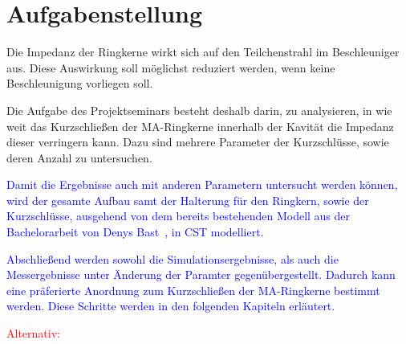 \section{Aufgabenstellung}
Die Impedanz der Ringkerne wirkt sich auf den Teilchenstrahl im Beschleuniger aus. Diese Auswirkung soll möglichst reduziert werden, wenn keine Beschleunigung vorliegen soll.
\par
Die Aufgabe des Projektseminars besteht deshalb darin, zu analysieren, in wie weit das Kurzschlie\ss{}en der MA-Ringkerne innerhalb der Kavit\"at die Impedanz dieser verringern kann. Dazu sind mehrere Parameter der Kurzschl\"usse, sowie deren Anzahl zu untersuchen.
\par
\textcolor{blue}{
Damit die Ergebnisse auch mit anderen Parametern untersucht werden k\"onnen, wird der gesamte Aufbau samt der Halterung f\"ur den Ringkern, sowie der Kurzschl\"usse, ausgehend von dem bereits bestehenden Modell aus der Bachelorarbeit von Denys Bast~\citep{bast2017ba}, in CST modelliert.}
\par
\textcolor{blue}{
Abschlie\ss{}end werden sowohl die Simulationsergebnisse, als auch die Messergebnisse unter \"Anderung der Paramter gegen\"ubergestellt. Dadurch kann eine pr\"aferierte Anordnung zum Kurzschlie\ss{}en der MA-Ringkerne bestimmt werden. Diese Schritte werden in den folgenden Kapiteln erl\"autert.}
\par 
\textcolor{red}{Alternativ:}

